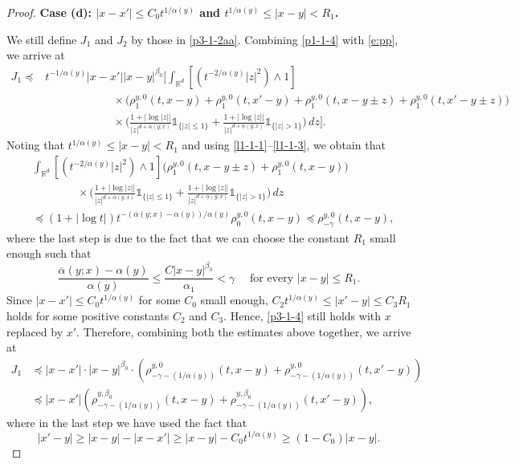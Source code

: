\documentclass[a4paper,11pt]{amsart}
\renewcommand{\le}{\leqslant}
\renewcommand{\ge}{\geqslant}
\newcommand{\R}{\mathds R}
\newcommand{\B}{\beta}
\newcommand{\I}{\mathds 1}
\newcommand{\p}{\preceq}
\newcommand{\A}{\alpha}
\theoremstyle{definition}
\begin{document}
\begin{proof}
{\bf Case (d): $|x-x'|\le C_0t^{{1/\A(y)}}$ and $t^{{1/\A(y)}}\le |x-y|< R_1$.}

We still define $J_1$ and $J_2$ by those in \eqref{p3-1-2aa}. Combining \eqref{p1-1-4} with \eqref{e:pp}, we arrive at
\begin{align*}
J_1 \p & t^{-{1/\A(y)}}|x-x'||x-y|^{\B_0}\Bigg[\int_{\R^d} \left[\left(t^{-{2}/{\A(y)}}|z|^2\right)\wedge 1\right]\\
&\qquad\qquad\qquad\times \big(
\rho_1^{y,0}(t,x-y)+\rho_1^{y,0}(t,x'-y)+\rho_1^{y,0}(t,x-y\pm z)+\rho_1^{y,0}(t,x'-y\pm z)\big)\\
&\qquad\qquad\qquad \times\bigg(\frac{1+|\log|z||}{|z|^{d+\overline{\A}(y;x)}}\I_{\{|z|\le 1\}}+\frac{1+|\log|z||}{|z|^{d+\underline{\A}(y;x)}}\I_{\{|z|> 1\}}\bigg)\,dz\Bigg].
\end{align*}
Noting that $t^{{1/\A(y)}}\le |x-y|< R_1$ and using \eqref{l1-1-1}--\eqref{l1-1-3}, we obtain that
\begin{equation}\label{p3-1-4}
\begin{split}
& \int_{\R^d} \left[\left(t^{-{2}/{\A(y)}}|z|^2\right)\wedge 1\right]\big
(\rho_1^{y,0}(t,x-y\pm z)+\rho_1^{y,0}(t,x-y)\big)\\
&\qquad\qquad \times \bigg(\frac{1+|\log|z||}{|z|^{d+\overline{\A}(y;x)}}\I_{\{|z|\le 1\}}
+\frac{1+|\log|z||}{|z|^{d+\underline{\A}(y;x)}}\I_{\{|z|> 1\}}\bigg)\,dz\\
&\p \left(1+|\log t|\right)t^{-{(\overline{\A}(y;x)-\A(y))}/{\A(y)}}
\rho_0^{y,0}(t,x-y)\p \rho_{-\gamma}^{y,0}(t,x-y),
\end{split}
\end{equation}
where the last step is due to the fact that we can choose the constant $R_1$ small enough such that $$\frac{\overline{\A}(y;x)-\A(y)}{\A(y)}\le
\frac{C|x-y|^{\B_0}}{\A_1}<\gamma\quad \textrm{ for every }|x-y|\le R_1.$$
Since $|x-x'|\le C_0 t^{{1/\A(y)}}$ for some $C_0$ small enough,
$C_2t^{{1/\A(y)}}\le |x'-y|\le C_3R_1$ holds for some positive constants $C_2$ and $C_3$. Hence, \eqref{p3-1-4} still holds with $x$ replaced by $x'$.
Therefore, combining both the estimates above together, we arrive at
\begin{align*}
J_1 &\p |x-x'|\cdot |x-y|^{\B_0}\cdot
\left(\rho^{y,0}_{-\gamma-({1/\A(y)})}(t,x-y)+\rho^{y,0}_{-\gamma-({1/\A(y)})}(t,x'-y)\right)\\
&\p |x-x'|\left(\rho^{y,\B_0}_{-\gamma-({1/\A(y)})}(t,x-y)+\rho^{y,\B_0}_{-\gamma-({1/\A(y)})}(t,x'-y)\right),
\end{align*}
where in the last step we have used the fact that
\begin{equation*}
|x'-y|\ge |x-y|-|x-x'| \ge |x-y|-C_0t^{{1/\A(y)}}\ge (1-C_0)|x-y|.
\end{equation*}


\end{proof}
\end{document}
